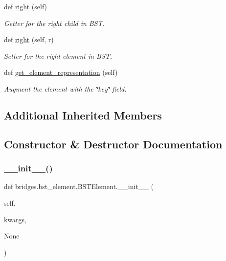 \begin{DoxyCompactItemize}
def \hyperlink{classbridges_1_1bst__element_1_1_b_s_t_element_a3ec82fbc56a5e6309b69d2d963b483fd}{right} (self)
\begin{DoxyCompactList}\small\item\em Getter for the right child in B\+ST. \end{DoxyCompactList}\item 
def \hyperlink{classbridges_1_1bst__element_1_1_b_s_t_element_a978ae0db366dee59703ed266eebca0e9}{right} (self, r)
\begin{DoxyCompactList}\small\item\em Setter for the right element in B\+ST. \end{DoxyCompactList}\item 
def \hyperlink{classbridges_1_1bst__element_1_1_b_s_t_element_a5f49ae18e50343ed63a83baa2c42e192}{get\+\_\+element\+\_\+representation} (self)
\begin{DoxyCompactList}\small\item\em Augment the element with the \char`\"{}key\char`\"{} field. \end{DoxyCompactList}\end{DoxyCompactItemize}
\subsection*{Additional Inherited Members}


\subsection{Constructor \& Destructor Documentation}
\mbox{\label{classbridges_1_1bst__element_1_1_b_s_t_element_ab5f7e1266a3e1777472702f5a3f595c5}} 
\subsubsection{\texorpdfstring{\+\_\+\+\_\+init\+\_\+\+\_\+()}{\_\_init\_\_()}}
{\footnotesize\ttfamily def bridges.\+bst\+\_\+element.\+B\+S\+T\+Element.\+\_\+\+\_\+init\+\_\+\+\_\+ (\begin{DoxyParamCaption}\item[{}]{self,  }\item[{}]{kwargs,  }\item[{}]{None }\end{DoxyParamCaption})}



